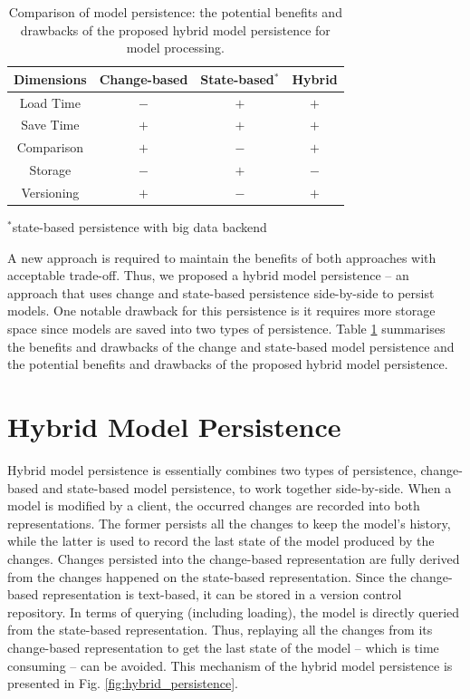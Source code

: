 \documentclass[10pt,conference]{IEEEtran}
\begin{document}
\begin{table} [ht]
    \centering
    \caption{Comparison of model persistence: the potential benefits and drawbacks of the proposed hybrid model persistence for model processing.}
    \label{table:persistence_comparsion}
    \begin{tabular}{ c c c c }
        \hline 
        \textbf{Dimensions} & \textbf{Change-based} & \textbf{State-based$^*$} & \textbf{Hybrid} \\
        \hline 
        Load Time & $-$ & $+$ & $+$  \\
        Save Time & $+$ & $+$ & $+$ \\
        Comparison & $+$ & $-$ & $+$ \\
        Storage & $-$ & $+$ & $-$ \\
        Versioning & $+$ & $-$ & $+$ \\
        \hline 
    \end{tabular}
    \flushright
    \tiny
    $^*$state-based persistence with big data backend
\end{table}

A new approach is required to maintain the benefits of both approaches with acceptable trade-off. Thus, we proposed a hybrid model persistence -- an approach that uses change and state-based persistence side-by-side to persist models. One notable drawback for this persistence is it requires more storage space since models are saved into two types of persistence. Table \ref{table:persistence_comparsion} summarises the benefits and drawbacks of the change and state-based model persistence and the potential benefits and drawbacks of the proposed hybrid model persistence.

\section{Hybrid Model Persistence}
\label{sec:hybrid_model_persistence}
Hybrid model persistence is essentially combines two types of persistence, change-based and state-based model persistence, to work together side-by-side. When a model is modified by a client, the occurred changes are recorded into both representations. The former persists all the changes to keep the model's history, while the latter is used to record the last state of the model produced by the changes. Changes persisted into the change-based representation are fully derived from the changes happened on the state-based representation. Since the change-based representation is text-based, it can be stored in a version control repository. In terms of querying (including loading), the model is directly queried from the state-based representation. Thus, replaying all the changes from its change-based representation to get the last state of the model -- which is time consuming -- can be avoided. This mechanism of the hybrid model persistence is presented in Fig. \ref{fig:hybrid_persistence}.
\end{document}
